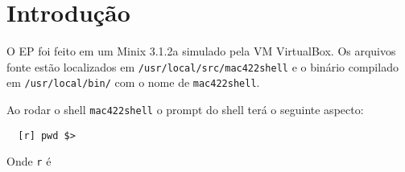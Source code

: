 \documentclass{amsart}
\title[]{\rule{10.5cm}{0.8pt}\\Exercício-Programa 1: mac422shell\\\vspace{2mm}\footnotesize
  Sistemas Operacionais -- MAC0422\\\rule{10cm}{0.8pt}}
\author[]{Renato Lui Geh\\NUSP\@: 8536030}
\theoremstyle{plain}
\newcommand{\code}[1]{\lstinline[mathescape=true]{#1}}
\begin{document}
\date{\today}

\begin{abstract}
  Relatório do Exercício Programa 1 de Sistemas Operacionais (MAC0422).
  \vspace*{-2.5em}
\end{abstract}

\maketitle

\section{Introdução}

O EP foi feito em um Minix 3.1.2a simulado pela VM VirtualBox. Os arquivos fonte estão localizados
em \code{/usr/local/src/mac422shell} e o binário compilado em \code{/usr/local/bin/} com o nome de
\code{mac422shell}.

Ao rodar o shell \code{mac422shell} o prompt do shell terá o seguinte aspecto:

\begin{lstlisting}
  [r] pwd $>
\end{lstlisting}

Onde \code{r} é
\end{document}
